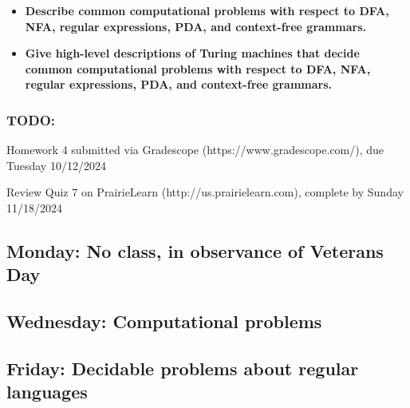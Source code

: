 \begin{itemize}
\begin{itemize}
    \begin{itemize}
    \item {\bf Describe common computational problems with respect to DFA, NFA, regular expressions, PDA, and context-free grammars.}
    \item {\bf Give high-level descriptions of Turing machines that decide common computational problems with respect to DFA, NFA, regular expressions, PDA, and context-free grammars.}
\end{itemize}
\end{itemize}
\end{itemize}

\vspace{-20pt}

\subsubsection*{TODO:}
\begin{list}{\itemsep-10pt}
   \item Homework 4 submitted via Gradescope (https://www.gradescope.com/), due Tuesday 10/12/2024
   \item Review Quiz 7 on PrairieLearn (http://us.prairielearn.com), complete by Sunday 11/18/2024
\end{list}

\newpage

\subsection*{Monday: No class, in observance of Veterans Day}
\subsection*{Wednesday: Computational problems}





\newpage
\subsection*{Friday: Decidable problems about regular languages}





